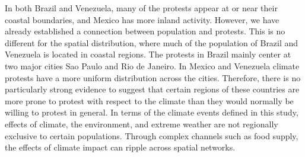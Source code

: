 In both Brazil and Venezuela, many of the protests appear at or near their coastal boundaries, and Mexico has more inland activity.
However, we have already established a connection between population and protests.
This is no different for the spatial distribution, where much of the population of Brazil and Venezuela is located in coastal regions.
The protests in Brazil mainly center at two major cities Sao Paulo and Rio de Janeiro.
In Mexico and Venezuela climate protests have a more uniform distribution across the cities.
Therefore, there is no particularly strong evidence to suggest that certain regions of these countries are more prone to protest with respect to the climate than they would normally be willing to protest in general.
In terms of the climate events defined in this study, effects of climate, the environment, and extreme weather are not regionally exclusive to certain populations.
Through complex channels such as food supply, the effects of climate impact can ripple across spatial networks.



